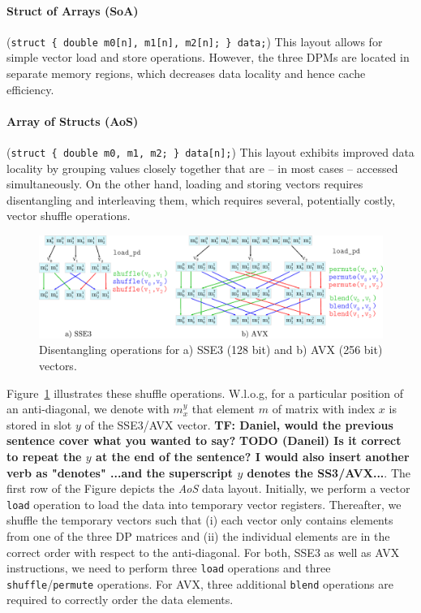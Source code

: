 \documentclass[runningheads,a4paper]{llncs}
\begin{document}
\paragraph*{Struct of Arrays (SoA)} ({\small\texttt{struct \{ double m0[n], m1[n], m2[n]; \} data;}})
This layout allows for simple vector load and store operations.
However, the three DPMs are located in separate memory regions, which decreases
data locality and hence cache efficiency.

\paragraph*{Array of Structs (AoS)} ({\small\texttt{struct \{ double m0, m1, m2; \}
data[n];}}) This layout exhibits improved data locality by grouping values
closely together that are -- in most cases -- accessed simultaneously. On the
other hand, loading and storing vectors requires disentangling and interleaving
them, which requires several, potentially costly, vector shuffle operations.

\begin{figure}[ht!]
  \centering
  \includegraphics[scale=0.6]{figures/shuffle.pdf}
  \caption{Disentangling operations for a) SSE3 (128 bit) and b) AVX (256 bit) vectors.}
  \label{fig:shufflesse}
\end{figure}

Figure~\ref{fig:shufflesse} illustrates these shuffle operations.
W.l.o.g, for a particular position of an anti-diagonal, we denote with $m_x^y$
that element $m$ of matrix with index $x$ is stored in slot $y$ of the SSE3/AVX
vector.
\textbf{TF: Daniel, would the previous sentence cover what you wanted to say?}
{\bf TODO (Daneil) Is it correct to repeat the $y$ at the end of the sentence? I would also insert another verb as "denotes" ...and the superscript $y$ denotes the SS3/AVX...}.
The first row of the Figure depicts the {\em AoS} data layout.
Initially, we perform a vector \texttt{load} operation
to load the data into temporary vector registers.
Thereafter, we shuffle the temporary vectors such that (i) each vector only contains elements from one of the three DP matrices and
(ii) the individual elements are in the correct order with respect to  the anti-diagonal.
For both, SSE3 as well as AVX instructions, we need to perform three \texttt{load} operations and three \texttt{shuffle}/\texttt{permute} operations.
For AVX, three additional \texttt{blend} operations are required to correctly order the data elements.
\end{document}
